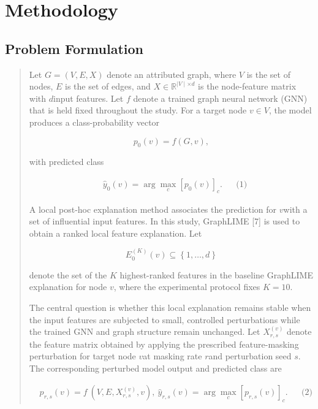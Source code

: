 \documentclass[a4paper]{article}
\begin{document}
\section{\texorpdfstring{Methodology }{Methodology }}\label{methodology}

\subsection{Problem Formulation}\label{problem-formulation}

\begin{quote}
Let \(G = \left( V,E,X \right)\) denote an attributed graph, where \(V\)
is the set of nodes, \(E\) is the set of edges, and
\(X \in \mathbb{R}^{\mid V \mid \times d}\) is the node-feature matrix
with \(d\)input features. Let \(f\) denote a trained graph neural
network (GNN) that is held fixed throughout the study. For a target node
\(v \in V\), the model produces a class-probability vector

\[p_{0}(v) = f\left( G,v \right),
\]

with predicted class

\[\begin{matrix}
 & {\widehat{y}}_{0}(v) = \arg\max_{c}\left\lbrack p_{0}(v) \right\rbrack_{c}. & & \text{(1)}
\end{matrix}
\]

A local post-hoc explanation method associates the prediction for
\(v\)with a set of influential input features. In this study, GraphLIME
{[}7{]} is used to obtain a ranked local feature explanation. Let

\[E_{0}^{(K)}(v) \subseteq \left\{ 1,\ldots,d \right\}
\]

denote the set of the \(K\) highest-ranked features in the baseline
GraphLIME explanation for node \(v\), where the experimental protocol
fixes \(K = 10\).

The central question is whether this local explanation remains stable
when the input features are subjected to small, controlled perturbations
while the trained GNN and graph structure remain unchanged. Let
\(X_{r,s}^{(v)}\) denote the feature matrix obtained by applying the
prescribed feature-masking perturbation for target node \(v\)at masking
rate \(r\)and perturbation seed \(s\). The corresponding perturbed model
output and predicted class are

\[\begin{matrix}
 & p_{r,s}(v) = f\text{ }\left( V,E,X_{r,s}^{(v)},v \right),\ {\widehat{y}}_{r,s}(v) = \arg\max_{c}\left\lbrack p_{r,s}(v) \right\rbrack_{c}. & & \text{(2)}
\end{matrix}
\]


\end{quote}
\end{document}
